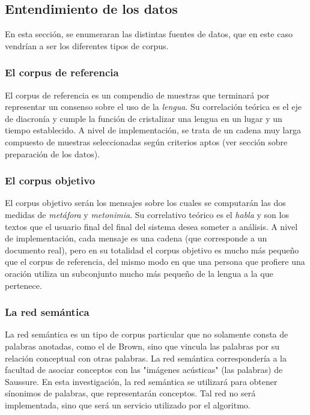 \documentclass[12pt,letterpaper,twoside]{article}
\begin{document}
\subsection{Entendimiento de los datos}
\label{sec:orga6696f2}

En esta sección, se enumeraran las distintas fuentes de datos,
que en este caso vendrían a ser los diferentes tipos de corpus.


\subsubsection{El corpus de referencia}
\label{sec:org299f3a0}

El corpus de referencia es un compendio de muestras
que terminará por representar un consenso sobre
el uso de la \emph{lengua}. Su correlación teórica
es el eje de diacronía y cumple la función de
cristalizar una lengua en un lugar y un tiempo establecido.
A nivel de implementación, se trata de un cadena muy larga
compuesto de muestras seleccionadas según criterios aptos
(ver sección sobre preparación de los datos).




\subsubsection{El corpus objetivo}
\label{sec:orga4cb8c3}

El corpus objetivo serán los mensajes sobre los cuales se
computarán las dos medidas de \emph{metáfora} y \emph{metonimia}.
Su correlativo teórico es el \emph{habla} y son los
textos que el usuario final del final del sistema desea
someter a análisis. A nivel de implementación, cada mensaje
es una cadena (que corresponde a un documento real), pero
en su totalidad el corpus objetivo es mucho más pequeño
que el corpus de referencia, del mismo modo en que una
persona que profiere una oración utiliza un subconjunto
mucho más pequeño de la lengua a la que pertenece.  

\subsubsection{La red semántica}
\label{sec:orgfae68c0}

La red semántica es un tipo de corpus particular que no solamente
consta de palabras anotadas, como el de Brown, sino que vincula
las palabras por su relación conceptual con otras palabras. La
red semántica correspondería a la facultad de asociar conceptos
con las "imágenes acústicas" (las palabras) de Saussure. En esta
investigación, la red semántica se utilizará para obtener
sínonimos de palabras, que representarán conceptos. Tal red
no será implementada, sino que será un servicio utilizado por
el algoritmo. 
\end{document}

